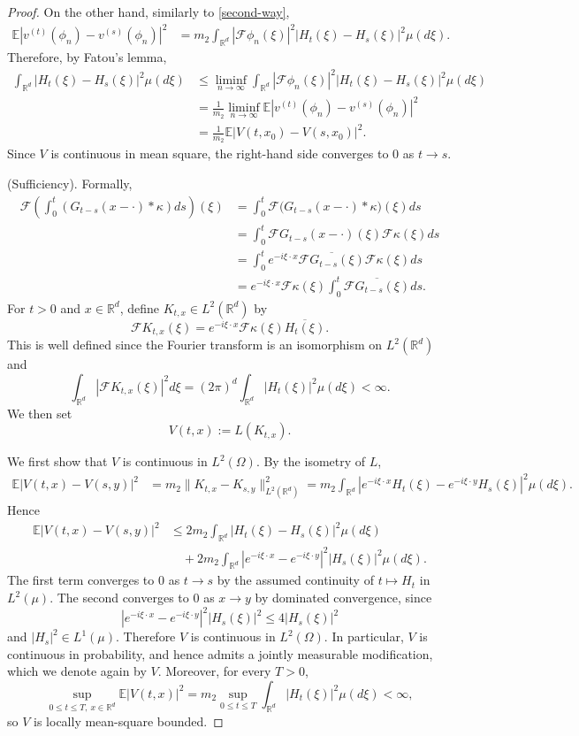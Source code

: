 \documentclass[12pt]{article}
\def\cF{\mathcal{F}}
\def\bE{\mathbb{E}}
\def\bR{\mathbb{R}}
\def\k{\kappa}
\begin{document}
\begin{proof}
On the other hand, similarly to \eqref{second-way},
\begin{align*}
\bE|v^{(t)}(\phi_n)-v^{(s)}(\phi_n)|^2
&=
m_2\int_{\bR^d}
|\cF\phi_n(\xi)|^2|H_t(\xi)-H_s(\xi)|^2\mu(d\xi).
\end{align*}
Therefore, by Fatou's lemma,
\begin{align*}
\int_{\bR^d}|H_t(\xi)-H_s(\xi)|^2\mu(d\xi)
&\le \liminf_{n\to\infty}
\int_{\bR^d}
|\cF\phi_n(\xi)|^2|H_t(\xi)-H_s(\xi)|^2\mu(d\xi)\\
&=\frac{1}{m_2}\liminf_{n\to\infty}
\bE|v^{(t)}(\phi_n)-v^{(s)}(\phi_n)|^2\\
&=\frac{1}{m_2}\bE|V(t,x_0)-V(s,x_0)|^2.
\end{align*}
Since $V$ is continuous in mean square, the right-hand side converges to $0$ as $t\to s$.



(Sufficiency). Formally, 
\begin{align*}
\cF\left(\int_0^t (G_{t-s}(x-\cdot)*\k)ds\right)(\xi)
&=\int_0^t \cF\big(G_{t-s}(x-\cdot)*\k\big)(\xi)ds\\
&=\int_0^t \cF G_{t-s}(x-\cdot)(\xi)\cF\k(\xi)ds\\
&=\int_0^t e^{-i\xi\cdot x}\overline{\cF G_{t-s}(\xi)}\cF\k(\xi)ds\\
&=e^{-i\xi\cdot x}\cF\k(\xi)\int_0^t \overline{\cF G_{t-s}(\xi)}ds.
\end{align*}
For $t>0$ and $x\in \bR^d$, define $K_{t,x}\in L^2(\bR^d)$ by
\[
\cF K_{t,x}(\xi)
=
e^{-i\xi\cdot x}\cF\k(\xi)\overline{H_t(\xi)}.
\]
This is well defined since the Fourier transform is an isomorphism on $L^2(\bR^d)$ and
\[
\int_{\bR^d}|\cF K_{t,x}(\xi)|^2d\xi
=
(2\pi)^d\int_{\bR^d}|H_t(\xi)|^2\mu(d\xi)<\infty.
\]
We then set
\[
V(t,x):=L(K_{t,x}).
\]


We first show that $V$ is continuous in $L^2(\Omega)$. By the isometry of $L$,
\begin{align*}
\mathbb E|V(t,x)-V(s,y)|^2
&=m_2\|K_{t,x}-K_{s,y}\|_{L^2(\bR^d)}^2=m_2\int_{\bR^d}
\left|e^{-i\xi\cdot x}{H_t(\xi)}
-
e^{-i\xi\cdot y}{H_s(\xi)}
\right|^2\mu(d\xi).
\end{align*}
Hence
\begin{align*}
\mathbb E|V(t,x)-V(s,y)|^2
&\le 2m_2\int_{\bR^d}|H_t(\xi)-H_s(\xi)|^2\mu(d\xi)\\
&\quad +2m_2\int_{\bR^d}|e^{-i\xi\cdot x}-e^{-i\xi\cdot y}|^2|H_s(\xi)|^2\mu(d\xi).
\end{align*}
The first term converges to $0$ as $t\to s$ by the assumed continuity of $t\mapsto H_t$ in
$L^2(\mu)$. The second converges to $0$ as $x\to y$ by dominated convergence, since
\[
|e^{-i\xi\cdot x}-e^{-i\xi\cdot y}|^2|H_s(\xi)|^2\le 4|H_s(\xi)|^2
\]
and $|H_s|^2\in L^1(\mu)$. Therefore $V$ is continuous in $L^2(\Omega)$. In particular, $V$ is continuous in probability,
and hence admits a jointly measurable modification, which we denote again by $V$.
Moreover, for every $T>0$,
\[
\sup_{0\le t\le T,\ x\in\bR^d}\mathbb E|V(t,x)|^2
=
m_2\sup_{0\le t\le T}\int_{\bR^d}|H_t(\xi)|^2\mu(d\xi)<\infty,
\]
so $V$ is locally mean-square bounded.


\end{proof}
\end{document}
